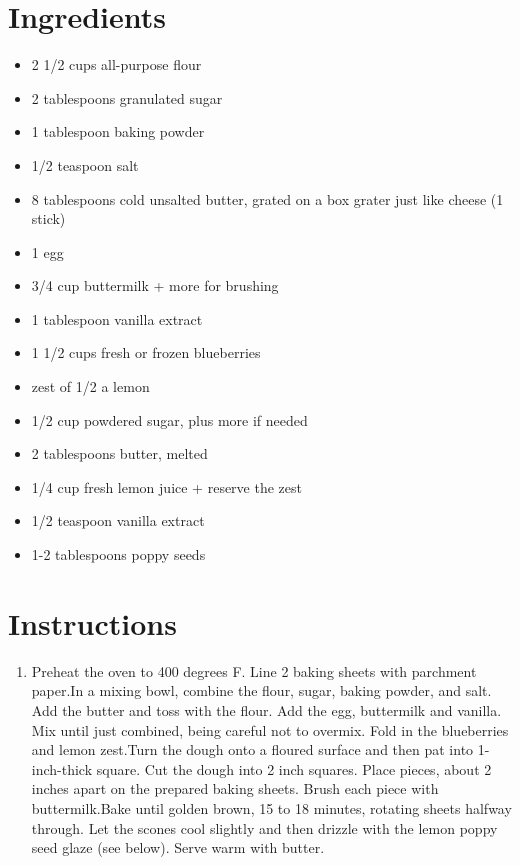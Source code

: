 \documentclass[
  letterpaper,
  DIV=11,
  numbers=noendperiod,
  titlepage=false]{scrreprt}
\providecommand{\tightlist}{%
  \setlength{\itemsep}{0pt}\setlength{\parskip}{0pt}}\usepackage{longtable,booktabs,array}
\begin{document}
\section{Ingredients}\label{ingredients-123}

\begin{itemize}
\tightlist
\item
  2 1/2 cups all-purpose flour
\item
  2 tablespoons granulated sugar
\item
  1 tablespoon baking powder
\item
  1/2 teaspoon salt
\item
  8 tablespoons cold unsalted butter, grated on a box grater just like
  cheese (1 stick)
\item
  1 egg
\item
  3/4 cup buttermilk + more for brushing
\item
  1 tablespoon vanilla extract
\item
  1 1/2 cups fresh or frozen blueberries
\item
  zest of 1/2 a lemon
\item
  1/2 cup powdered sugar, plus more if needed
\item
  2 tablespoons butter, melted
\item
  1/4 cup fresh lemon juice + reserve the zest
\item
  1/2 teaspoon vanilla extract
\item
  1-2 tablespoons poppy seeds
\end{itemize}

\section{Instructions}\label{instructions-123}

\begin{enumerate}
\def\labelenumi{\arabic{enumi}.}
\tightlist
\item
  Preheat the oven to 400 degrees F. Line 2 baking sheets with parchment
  paper.In a mixing bowl, combine the flour, sugar, baking powder, and
  salt. Add the butter and toss with the flour. Add the egg, buttermilk
  and vanilla. Mix until just combined, being careful not to overmix.
  Fold in the blueberries and lemon zest.Turn the dough onto a floured
  surface and then pat into 1-inch-thick square. Cut the dough into 2
  inch squares. Place pieces, about 2 inches apart on the prepared
  baking sheets. Brush each piece with buttermilk.Bake until golden
  brown, 15 to 18 minutes, rotating sheets halfway through. Let the
  scones cool slightly and then drizzle with the lemon poppy seed glaze
  (see below). Serve warm with butter.
\end{enumerate}
\end{document}
